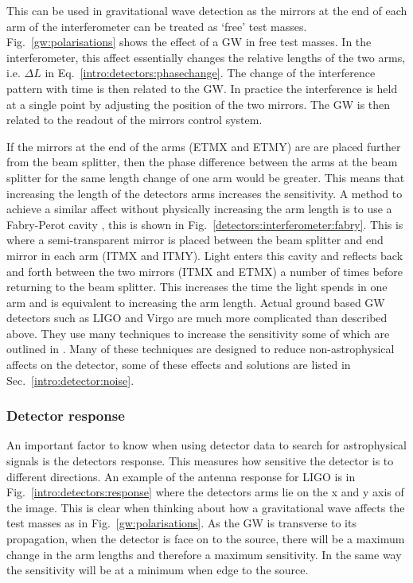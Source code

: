 %
This can be used in gravitational wave detection as the mirrors at the end of each arm of the interferometer can be treated as `free' test masses.
Fig.~\ref{gw:polarisations} shows the effect of a \gls{GW} in free test masses.
In the interferometer, this affect essentially changes the relative lengths of the two arms, i.e. $\Delta L$ in Eq.~\ref{intro:detectors:phasechange}.
The change of the interference pattern with time is then related to the \gls{GW}.
In practice the interference is held at a single point by adjusting the position of the two mirrors.
The \gls{GW} is then related to the readout of the mirrors control system.

If the mirrors at the end of the arms (ETMX and ETMY) are are placed further from the beam splitter, then the phase difference between the arms at the beam splitter for the same length change of one arm would be greater. 
This means that increasing the length of the detectors arms increases the sensitivity. 
A method to achieve a similar affect without physically increasing the arm length is to use a Fabry-Perot cavity \citep{aasi2015AdvancedLIGO}, this is shown in Fig.~\ref{detectors:interferometer:fabry}.
This is where a semi-transparent mirror is placed between the beam splitter and end mirror in each arm (ITMX and ITMY).
Light enters this cavity and reflects back and forth between the two mirrors (ITMX and ETMX) a number of times before returning to the beam splitter.
This increases the time the light spends in one arm and is equivalent to increasing the arm length.
Actual ground based \gls{GW} detectors such as \gls{LIGO} \citep{abbott2009LIGOLaser} and Virgo \citep{acernese2015AdvancedVirgo} are much more complicated than described above.
They use many techniques to increase the sensitivity some of which are outlined in \citep{aasi2015AdvancedLIGO,abbott2009LIGOLaser}.
Many of these techniques are designed to reduce non-astrophysical affects on the detector, some of these effects and solutions are listed in Sec.~\ref{intro:detector:noise}.



\subsubsection{Detector response}

An important factor to know when using detector data to search for astrophysical signals is the detectors response.
This measures how sensitive the detector is to different directions.
An example of the antenna response for \gls{LIGO} is in Fig.~\ref{intro:detectors:response} where the detectors arms lie on the x and y axis of the image.
This is clear when thinking about how a gravitational wave affects the test masses as in Fig.~\ref{gw:polarisations}. 
As the \gls{GW} is transverse to its propagation, when the detector is face on to the source, there will be a maximum change in the arm lengths and therefore a maximum sensitivity. 
In the same way the sensitivity will be at a minimum when edge to the source.


